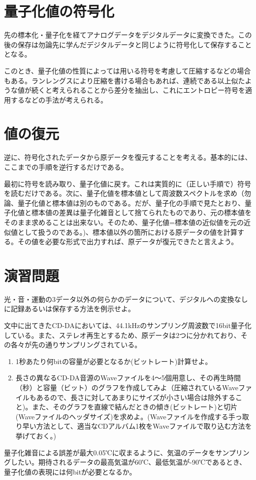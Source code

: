 \section{量子化値の符号化}
先の標本化・量子化を経てアナログデータをデジタルデータに変換できた。この後の保存は勿論先に学んだデジタルデータと同じように符号化して保存することとなる。

このとき、量子化値の性質によっては用いる符号を考慮して圧縮するなどの場合もある。ランレングスにより圧縮を書ける場合もあれば、連続である以上似たような値が続くと考えられることから差分を抽出し、これにエントロピー符号を適用するなどの手法が考えられる。

\section{値の復元}

逆に、符号化されたデータから原データを復元することを考える。基本的には、ここまでの手順を逆行するだけである。

最初に符号を読み取り、量子化値に戻す。これは実質的に（正しい手順で）符号を読むだけである。次に、量子化値を標本値として周波数スペクトルを求め（勿論、量子化値と標本値は別のものである。だが、量子化の手順で見たとおり、量子化値と標本値の差異は量子化雑音として捨てられたものであり、元の標本値をそのまま求めることは出来ない。そのため、量子化値=標本値の近似値を元の近似値として扱うのである。)、標本値以外の箇所における原データの値を計算する。その値を必要な形式で出力すれば、原データが復元できたと言えよう。

\section*{演習問題}
\begin{problems}
\item 光・音・運動の3データ以外の何らかのデータについて、デジタルへの変換なしに記録あるいは保存する方法を例示せよ。%

\item 文中に出てきたCD-DAにおいては、44.1kHzのサンプリング周波数で16bit量子化している。また、ステレオ再生とするため、原データは2つに分かれており、その各々が先の通りサンプリングされている。
\begin{enumerate}
\item 1秒あたり何bitの容量が必要となるか(ビットレート)計算せよ。
\item 長さの異なるCD-DA音源のWaveファイルを4〜5個用意し、その再生時間（秒）と容量（ビット）のグラフを作成してみよ（圧縮されているWaveファイルもあるので、長さに対してあまりにサイズが小さい場合は除外すること)。また、そのグラフを直線で結んだときの傾き(ビットレート)と切片(Waveファイルのヘッダサイズ)を求めよ。(Waveファイルを作成する手っ取り早い方法として、適当なCDアルバム1枚をWaveファイルで取り込む方法を挙げておく。)
\end{enumerate}

\item 量子化雑音による誤差が最大0.05℃に収まるように、気温のデータをサンプリングしたい。期待されるデータの最高気温が60℃、最低気温が-90℃であるとき、量子化値の表現には何bitが必要となるか。
\end{problems}
